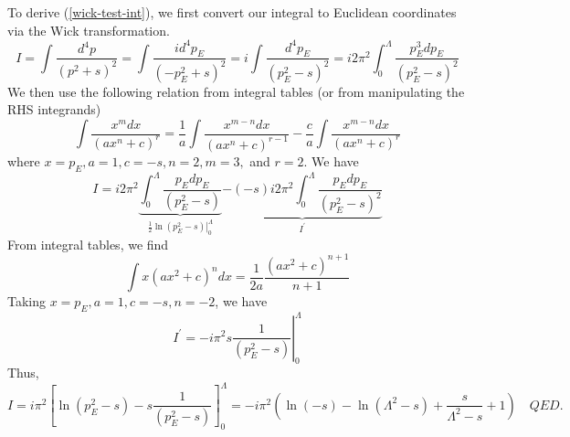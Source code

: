 To derive (\ref{wick-test-int}), we first convert our integral to Euclidean coordinates via the Wick transformation. 
\begin{equation}
I=\int \frac{d^{4} p}{\left(p^{2}+s\right)^{2}}=\int \frac{i d^{4} p_{E}}{\left(-p_{E}^{2}+s\right)^{2}}=i \int \frac{d^{4} p_{E}}{\left(p_{E}^{2}-s\right)^{2}}=i 2 \pi^{2} \int_{0}^{\Lambda} \frac{p_{E}^{3} d p_{E}}{\left(p_{E}^{2}-s\right)^{2}}\end{equation}
We then use the following relation from integral tables (or from manipulating the RHS integrands)
\begin{equation}\int \frac{x^{m} d x}{\left(a x^{n}+c\right)^{r}}=\frac{1}{a} \int \frac{x^{m-n} d x}{\left(a x^{n}+c\right)^{r-1}}-\frac{c}{a} \int \frac{x^{m-n} d x}{\left(a x^{n}+c\right)^{r}}\end{equation}
where $x=p_{E}, a=1, c=-s, n=2, m=3,$ and $r=2$. We have
\begin{equation}
I=i 2 \pi^{2} \underbrace{\int_{0}^{\Lambda} \frac{p_{E} d p_{E}}{\left(p_{E}^{2}-s\right)}}_{\left.\frac{1}{2} \ln \left(p_{E}^{2}-s\right)\right|_{0} ^{\Lambda}}\underbrace{-(-s) i 2 \pi^{2} \int_{0}^{\Lambda} \frac{p_{E} d p_{E}}{\left(p_{E}^{2}-s\right)^{2}}}_{I^{\prime}}\end{equation}
From integral tables, we find
\begin{equation}\int x\left(a x^{2}+c\right)^{n} d x=\frac{1}{2 a} \frac{\left(a x^{2}+c\right)^{n+1}}{n+1}\end{equation}
Taking $x=p_{E}, a=1, c=-s, n=-2$, we have
\begin{equation}
    I^{\prime}=-\left.i \pi^{2} s \frac{1}{\left(p_{E}^{2}-s\right)}\right|_{0} ^{\Lambda}
\end{equation}
Thus,
\begin{equation}
I=i \pi^{2}\left[\ln \left(p_{E}^{2}-s\right)-s \frac{1}{\left(p_{E}^{2}-s\right)}\right]_{0}^{\Lambda}=-i \pi^{2}\left(\ln (-s)-\ln \left(\Lambda^{2}-s\right)+\frac{s}{\Lambda^{2}-s}+1\right)\quad QED.
\end{equation}
